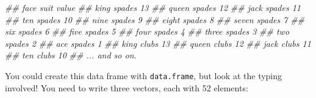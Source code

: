 \documentclass[
  letterpaper,
  DIV=11,
  numbers=noendperiod]{scrbook}
\newenvironment{Shaded}{\begin{snugshade}}{\end{snugshade}}
\newcommand{\DocumentationTok}[1]{\textcolor[rgb]{0.37,0.37,0.37}{\textit{#1}}}
\begin{document}
\begin{Shaded}
\begin{Highlighting}[]
\DocumentationTok{\#\#   face     suit value}
\DocumentationTok{\#\#   king   spades    13}
\DocumentationTok{\#\#  queen   spades    12}
\DocumentationTok{\#\#   jack   spades    11}
\DocumentationTok{\#\#    ten   spades    10}
\DocumentationTok{\#\#   nine   spades     9}
\DocumentationTok{\#\#  eight   spades     8}
\DocumentationTok{\#\#  seven   spades     7}
\DocumentationTok{\#\#    six   spades     6}
\DocumentationTok{\#\#   five   spades     5}
\DocumentationTok{\#\#   four   spades     4}
\DocumentationTok{\#\#  three   spades     3}
\DocumentationTok{\#\#    two   spades     2}
\DocumentationTok{\#\#    ace   spades     1}
\DocumentationTok{\#\#   king    clubs    13}
\DocumentationTok{\#\#  queen    clubs    12}
\DocumentationTok{\#\#   jack    clubs    11}
\DocumentationTok{\#\#    ten    clubs    10}
\DocumentationTok{\#\#   ... and so on.}
\end{Highlighting}
\end{Shaded}

You could create this data frame with \texttt{data.frame}, but look at
the typing involved! You need to write three vectors, each with 52
elements:
\end{document}
